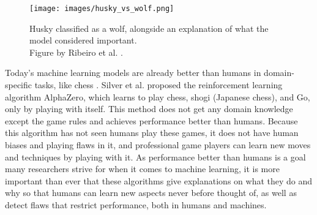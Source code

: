 \begin{figure}[htb]
    \centering
    \texttt{[image: images/husky\_vs\_wolf.png]}
    \caption[Husky classified as a wolf, alongside what the model considered important.]{Husky classified as a wolf, alongside an explanation of what the model considered important.\\ Figure by Ribeiro et al. \cite{ribeiroWhyShouldTrust2016}.}
    \label{fig:wolf_husky}
\end{figure} 


Today's machine learning models are already better than humans in domain-specific tasks, like chess \cite{campbellDeepBlue2002}. Silver et al. \cite{silverGeneralReinforcementLearning2018} proposed the reinforcement learning algorithm AlphaZero, which learns to play chess, shogi (Japanese chess), and Go, only by playing with itself. This method does not get any domain knowledge except the game rules and achieves performance better than humans. Because this algorithm has not seen humans play these games, it does not have human biases and playing flaws in it, and professional game players can learn new moves and techniques by playing with it. 
As performance better than humans is a goal many researchers strive for when it comes to machine learning, it is more important than ever that these algorithms give explanations on what they do and why so that humans can learn new aspects never before thought of, as well as detect flaws that restrict performance, both in humans and machines.
